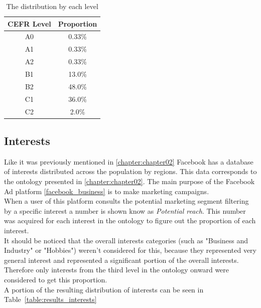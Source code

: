 \begin{table}[]
    \centering
    \begin{tabular}{cc}
    \hline
    CEFR Level & Proportion \\
    \hline
    A0         & 0.33\%     \\
    A1         & 0.33\%     \\
    A2         & 0.33\%     \\
    B1         & 13.0\%     \\
    B2         & 48.0\%     \\
    C1         & 36.0\%     \\
    C2         & 2.0\%      \\
    \hline
    \end{tabular}
    \caption{The distribution by each level}
    \label{table:results_levels}
\end{table}

\subsection{Interests} 

Like it was previously mentioned in \ref{chapter:chapter02} Facebook has a database of interests distributed across the population by regions. This data corresponds to the ontology presented in \ref{chapter:chapter02}. The main purpose of the Facebook Ad platform \ref{facebook_business} is to make marketing campaigns.\\

When a user of this platform consults the potential marketing segment filtering by a specific interest a number is shown know as \textit{Potential reach}. This number was acquired for each interest in the ontology to figure out the proportion of each interest.\\

It should be noticed that the overall interests categories (such as "Business and Industry" or "Hobbies") weren't considered for this, because they represented very general interest and represented a significant portion of the overall interests. Therefore only interests from the third level in the ontology onward were considered to get this proportion.\\

A portion of the resulting distribution of interests can be seen in Table~\ref{table:results_interests}

